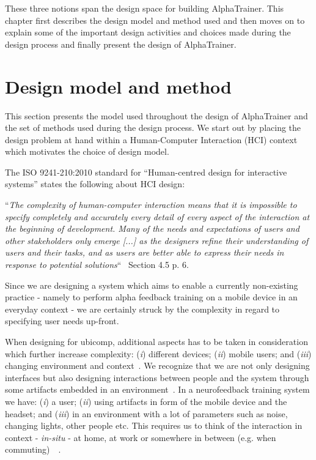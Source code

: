 \documentclass[a4paper,10pt,english,lof,lot,twoside]{puthesis}
\begin{document}
These three notions span the design space for building AlphaTrainer. This
chapter first describes the design model and method used and then moves on to
explain some of the important design activities and choices made during the
design process and finally present the design of AlphaTrainer.


\section{Design model and method}
\label{ch-design/index:ch-design-model-and-method}\label{ch-design/index:design-model-and-method}
This section presents the model used throughout the design of AlphaTrainer and
the set of methods used during the design process. We start out by placing the
design problem at hand within a Human-Computer Interaction (HCI) context which
motivates the choice of design model.

The ISO 9241-210:2010 standard for ``Human-centred design for interactive
systems'' states the following about HCI design:

``\emph{The complexity of human-computer interaction means that it is impossible to
specify completely and accurately every detail of every aspect of the
interaction at the beginning of development. Many of the needs and expectations
of users and other stakeholders only emerge {[}...{]} as the designers refine their
understanding of users and their tasks, and as users are better able to express
their needs in response to potential solutions}`` \cite{iso_iso_2010}
Section 4.5 p. 6.

Since we are designing a system which aims to enable a currently non-existing
practice - namely to perform alpha feedback training on a mobile device in an
everyday context - we are certainly struck by the complexity in regard to
specifying user needs up-front.

When designing for ubicomp, additional aspects has to be taken in consideration
which further increase complexity: (\emph{i}) different devices; (\emph{ii}) mobile users;
and (\emph{iii}) changing environment and context \cite{bardram_ubiquitous_2010}. We recognize that we are not only designing
interfaces but also designing interactions between people and the system through
some artifacts embedded in an environment \cite{beaudouin-lafon_designing_2004}. In a neurofeedback training system we
have: (\emph{i}) a user; (\emph{ii}) using artifacts in form of the mobile device and the
headset; and (\emph{iii}) in an environment with a lot of parameters such as noise,
changing lights, other people etc. This requires us to think of the interaction
in context - \emph{in-situ} - at home, at work or somewhere in between (e.g. when
commuting) \cite{benyon_designing_2005} \cite{abowd_human_2002}.
\end{document}
